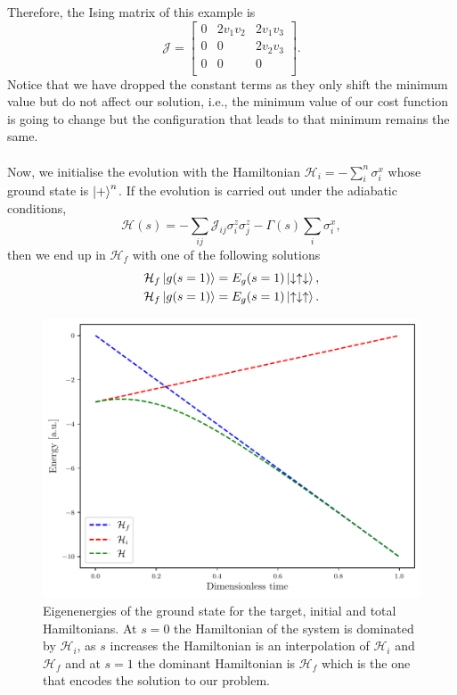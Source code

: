 Therefore, the Ising matrix of this example is
\begin{equation}
\mathcal{J}= 
    \begin{bmatrix}
           0 & 2v_{1}v_{2} & 2v_{1}v_{3}\\
           0 & 0 & 2v_{2}v_{3}\\
           0& 0 & 0\\
         \end{bmatrix}.
\end{equation}
Notice that we have dropped the constant terms as they only shift the minimum value but do not affect our solution, i.e., the minimum value of our cost function is going to change but the configuration that leads to that minimum remains the same.\\\\
Now, we initialise the evolution with the Hamiltonian $\mathcal{H}_{i} = -\sum_{i}^{n}\sigma_{i}^{x}$ whose ground state is $\ket{+}^{n}$. 
If the evolution is carried out under the adiabatic conditions,
\begin{equation}
    \mathcal{H}(s) = -\sum_{ij}\mathcal{J}_{ij}\sigma_{i}^{z}\sigma_{j}^{z}  - \Gamma(s)\sum_{i}\sigma_{i}^{x},
\end{equation}
then we end up in $\mathcal{H}_{f}$ with one of the following solutions
\begin{align}
    \mathcal{H}_{f}\ket{g(s=1)} = E_{g}(s=1)\ket{\downarrow\uparrow\downarrow}, \\
    \mathcal{H}_{f}\ket{g(s=1)} = E_{g}(s=1)\ket{\uparrow\downarrow\uparrow}.
\end{align}
\begin{figure}[H]
\centering
\includegraphics[width=\textwidth]{Figures/Two-Heirs.pdf}
    \caption{Eigenenergies of the ground state for the target, initial and total Hamiltonians. At $s=0$ the Hamiltonian of the system is dominated by $\mathcal{H}_{i}$, as $s$ increases the Hamiltonian is an interpolation of $\mathcal{H}_{i}$ and $\mathcal{H}_{f}$ and at $s=1$ the dominant Hamiltonian is $\mathcal{H}_{f}$ which is the one that encodes the solution to our problem.}
    \label{fig:HamiltonianInterpolation}
\end{figure}
